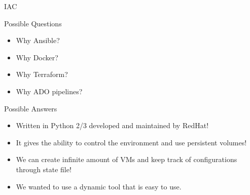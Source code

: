 \begin{frame}{IAC}
	\begin{alertblock}{Possible Questions}
		\begin{itemize}
			\item<1-| alert@1> Why Ansible?
			\item<2-| alert@2> Why Docker?
			\item<3-| alert@3> Why Terraform?
			\item<4-| alert@4> Why ADO pipelines?
		\end{itemize}	
	\end{alertblock}
	\begin{exampleblock}{Possible Answers}
		\begin{itemize}
			\item<1-| alert@1> Written in Python 2/3 developed and maintained by RedHat!
			\item<2-| alert@2> It gives the ability to control the environment and use persistent volumes!
			\item<3-| alert@3> We can create infinite amount of VMs and keep track of configurations through state file!
			\item<4-| alert@4> We wanted to use a dynamic tool that is easy to use.
		\end{itemize}	
	\end{exampleblock}
\end{frame}
